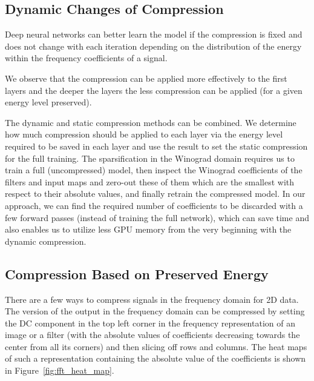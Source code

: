 \subsection{Dynamic Changes of Compression}

Deep neural networks can better learn the model if the compression is fixed and does not change with each iteration depending on the distribution of the energy within the frequency coefficients of a signal. %

We observe that the compression can be applied more effectively to the first layers and the deeper the layers the less compression can be applied (for a given energy level preserved).

The dynamic and static compression methods can be combined. We determine how much compression should be applied to each layer via the energy level required to be saved in each layer and use the result to set the static compression for the full training.  
The sparsification in the Winograd domain requires us to train a full (uncompressed) model, then inspect the Winograd coefficients of the filters and input maps and zero-out these of them which are the smallest with respect to their absolute values, and finally retrain the compressed model. In our approach, we can find the required number of coefficients to be discarded with a few forward passes (instead of training the full network), which can save time and also enables us to utilize less GPU memory from the very beginning with the dynamic compression. 

\subsection{Compression Based on Preserved Energy}

There are a few ways to compress signals in the frequency domain for 2D data. The version of the output in the frequency domain can be compressed by setting the DC component in the top left corner in the frequency representation of an image or a filter (with the absolute values of coefficients decreasing towards the center from all its corners) and then slicing off rows and columns. The heat maps of such a representation containing the absolute value of the coefficients is shown in Figure~\ref{fig:fft_heat_map}.

